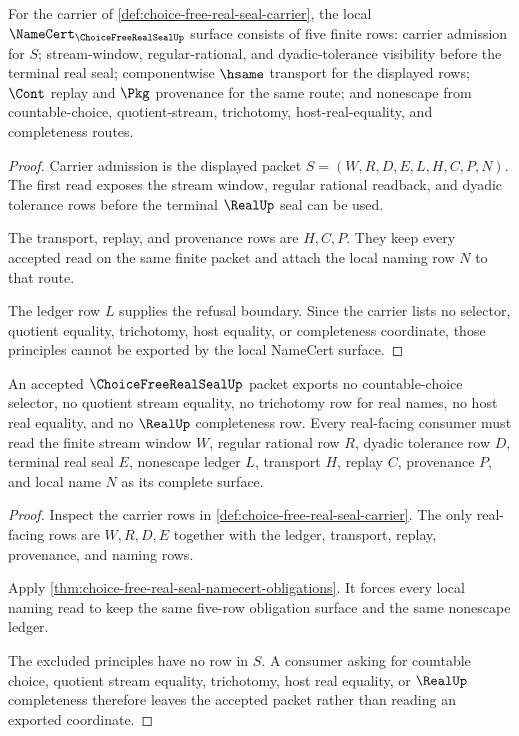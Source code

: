 \begin{theorem}
\label{thm:choice-free-real-seal-namecert-obligations}
For the carrier of \autoref{def:choice-free-real-seal-carrier}, the local $\NameCert_{\ChoiceFreeRealSealUp}$ surface consists of five finite rows: carrier admission for $S$; stream-window, regular-rational, and dyadic-tolerance visibility before the terminal real seal; componentwise $\hsame$ transport for the displayed rows; $\Cont$ replay and $\Pkg$ provenance for the same route; and nonescape from countable-choice, quotient-stream, trichotomy, host-real-equality, and completeness routes.
\end{theorem}
\begin{proof}
Carrier admission is the displayed packet $S=(W,R,D,E,L,H,C,P,N)$. The first read exposes the stream window, regular rational readback, and dyadic tolerance rows before the terminal $\RealUp$ seal can be used.

The transport, replay, and provenance rows are $H,C,P$. They keep every accepted read on the same finite packet and attach the local naming row $N$ to that route.

The ledger row $L$ supplies the refusal boundary. Since the carrier lists no selector, quotient equality, trichotomy, host equality, or completeness coordinate, those principles cannot be exported by the local NameCert surface.
\end{proof}

\begin{theorem}
\label{thm:choice-free-real-seal-no-countable-choice-route}
An accepted $\ChoiceFreeRealSealUp$ packet exports no countable-choice selector, no quotient stream equality, no trichotomy row for real names, no host real equality, and no $\RealUp$ completeness row. Every real-facing consumer must read the finite stream window $W$, regular rational row $R$, dyadic tolerance row $D$, terminal real seal $E$, nonescape ledger $L$, transport $H$, replay $C$, provenance $P$, and local name $N$ as its complete surface.
\end{theorem}
\begin{proof}
Inspect the carrier rows in \autoref{def:choice-free-real-seal-carrier}. The only real-facing rows are $W,R,D,E$ together with the ledger, transport, replay, provenance, and naming rows.

Apply \autoref{thm:choice-free-real-seal-namecert-obligations}. It forces every local naming read to keep the same five-row obligation surface and the same nonescape ledger.

The excluded principles have no row in $S$. A consumer asking for countable choice, quotient stream equality, trichotomy, host real equality, or $\RealUp$ completeness therefore leaves the accepted packet rather than reading an exported coordinate.
\end{proof}


